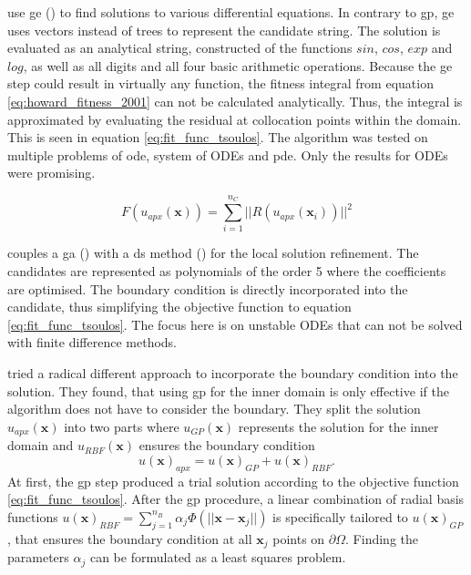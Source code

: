 \documentclass[./\jobname.tex]{subfiles}
\begin{document}
\cite{tsoulos_solving_2006} use \gls{ge} (\cite{ryan_grammatical_1998}) to find solutions to various differential equations. In contrary to \gls{gp}, \gls{ge} uses vectors instead of trees to represent the candidate string. The solution is evaluated as an analytical string, constructed of the functions $sin$, $cos$, $exp$ and $log$, as well as all digits and all four basic arithmetic operations. Because the \gls{ge} step could result in virtually any function, the fitness integral from equation \eqref{eq:howard_fitness_2001} can not be calculated analytically. Thus, the integral is approximated by evaluating the residual at collocation points within the domain. This is seen in equation \eqref{eq:fit_func_tsoulos}. The algorithm was tested on multiple problems of \gls{ode}, system of ODEs and \gls{pde}. Only the results for ODEs were promising.

\begin{equation}
\label{eq:fit_func_tsoulos}
F(u_{apx}(\mathbf{x})) = \sum_{i=1}^{n_C} ||R(u_{apx}(\mathbf{x}_i))||^2
\end{equation} 

\cite{mastorakis_unstable_2006} couples a \gls{ga} (\cite{holland_outline_1962}) with a \gls{ds} method (\cite{nelder_simplex_1965}) for the local solution refinement. The candidates are represented as polynomials of the order 5 where the coefficients are optimised. The boundary condition is directly incorporated into the candidate, thus simplifying the objective function to equation \eqref{eq:fit_func_tsoulos}. The focus here is on unstable ODEs that can not be solved with finite difference methods. 

\cite{sobester_genetic_2008} tried a radical different approach to incorporate the boundary condition into the solution. They found, that using \gls{gp} for the inner domain is only effective if the algorithm does not have to consider the boundary. They split the solution $u_{apx}(\mathbf{x})$ into two parts where $u_{GP}(\mathbf{x})$ represents the solution for the inner domain and $u_{RBF}(\mathbf{x})$ ensures the boundary condition 
\begin{equation}
\label{eq:solution_sobester}
u(\mathbf{x})_{apx} = u(\mathbf{x})_{GP} + u(\mathbf{x})_{RBF}.
\end{equation}
At first, the \gls{gp} step produced a trial solution according to the objective function \eqref{eq:fit_func_tsoulos}. After the \gls{gp} procedure, a linear combination of radial basis functions $u(\mathbf{x})_{RBF} = \sum_{j=1}^{n_B} \alpha_j \Phi (||\mathbf{x}-\mathbf{x}_{j}||)$ is specifically tailored to $u(\mathbf{x})_{GP}$, that ensures the boundary condition at all $\mathbf{x}_{j}$ points on $\partial \Omega$. Finding the parameters $\alpha_j$ can be formulated as a least squares problem. 
\end{document}
